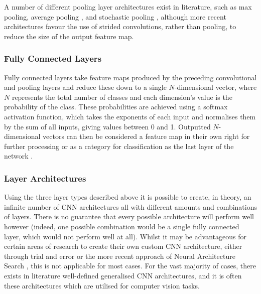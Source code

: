 A number of different pooling layer architectures exist in literature, such as max pooling, average pooling \cite{boureau_theoretical_2010}, and stochastic pooling \cite{zeiler_stochastic_2013}, although more recent architectures favour the use of strided convolutions, rather than pooling, to reduce the size of the output feature map.

\subsubsection{Fully Connected Layers}\label{ch:Background,sec:CNN,sub:CNN,subsubsec:fullyConnected}

Fully connected layers take feature maps produced by the preceding convolutional and pooling layers and reduce these down to a single $N$-dimensional vector, where $N$ represents the total number of classes and each dimension's value is the probability of the class. These probabilities are achieved using a softmax activation function, which takes the exponents of each input and normalises them by the sum of all inputs, giving values between 0 and 1. Outputted $N$-dimensional vectors can then be considered a feature map in their own right for further processing \cite{krizhevsky_imagenet_2012} or as a category for classification as the last layer of the network \cite{girshick_rich_2014}.

\subsubsection{Layer Architectures}\label{ch:Background,sec:CNN,sub:CNN,subsub:layerArchitecture}

Using the three layer types described above it is possible to create, in theory, an infinite number of CNN architectures all with different amounts and combinations of layers. There is no guarantee that every possible architecture will perform well however (indeed, one possible combination would be a single fully connected layer, which would not perform well at all). Whilst it may be advantageous for certain areas of research to create their own custom CNN architecture, either through trial and error or the more recent approach of Neural Architecture Search \cite{elsken_neural_2018}, this is not applicable for most cases. For the vast majority of cases, there exists in literature well-defined generalised CNN architectures, and it is often these architectures which are utilised for computer vision tasks. 

